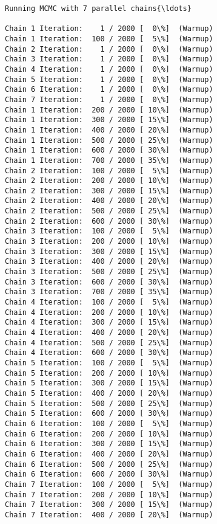 \documentclass[11pt]{article}
\begin{document}
    \begin{Verbatim}[commandchars=\\\{\}]
Running MCMC with 7 parallel chains{\ldots}

Chain 1 Iteration:    1 / 2000 [  0\%]  (Warmup)
Chain 1 Iteration:  100 / 2000 [  5\%]  (Warmup)
Chain 2 Iteration:    1 / 2000 [  0\%]  (Warmup)
Chain 3 Iteration:    1 / 2000 [  0\%]  (Warmup)
Chain 4 Iteration:    1 / 2000 [  0\%]  (Warmup)
Chain 5 Iteration:    1 / 2000 [  0\%]  (Warmup)
Chain 6 Iteration:    1 / 2000 [  0\%]  (Warmup)
Chain 7 Iteration:    1 / 2000 [  0\%]  (Warmup)
Chain 1 Iteration:  200 / 2000 [ 10\%]  (Warmup)
Chain 1 Iteration:  300 / 2000 [ 15\%]  (Warmup)
Chain 1 Iteration:  400 / 2000 [ 20\%]  (Warmup)
Chain 1 Iteration:  500 / 2000 [ 25\%]  (Warmup)
Chain 1 Iteration:  600 / 2000 [ 30\%]  (Warmup)
Chain 1 Iteration:  700 / 2000 [ 35\%]  (Warmup)
Chain 2 Iteration:  100 / 2000 [  5\%]  (Warmup)
Chain 2 Iteration:  200 / 2000 [ 10\%]  (Warmup)
Chain 2 Iteration:  300 / 2000 [ 15\%]  (Warmup)
Chain 2 Iteration:  400 / 2000 [ 20\%]  (Warmup)
Chain 2 Iteration:  500 / 2000 [ 25\%]  (Warmup)
Chain 2 Iteration:  600 / 2000 [ 30\%]  (Warmup)
Chain 3 Iteration:  100 / 2000 [  5\%]  (Warmup)
Chain 3 Iteration:  200 / 2000 [ 10\%]  (Warmup)
Chain 3 Iteration:  300 / 2000 [ 15\%]  (Warmup)
Chain 3 Iteration:  400 / 2000 [ 20\%]  (Warmup)
Chain 3 Iteration:  500 / 2000 [ 25\%]  (Warmup)
Chain 3 Iteration:  600 / 2000 [ 30\%]  (Warmup)
Chain 3 Iteration:  700 / 2000 [ 35\%]  (Warmup)
Chain 4 Iteration:  100 / 2000 [  5\%]  (Warmup)
Chain 4 Iteration:  200 / 2000 [ 10\%]  (Warmup)
Chain 4 Iteration:  300 / 2000 [ 15\%]  (Warmup)
Chain 4 Iteration:  400 / 2000 [ 20\%]  (Warmup)
Chain 4 Iteration:  500 / 2000 [ 25\%]  (Warmup)
Chain 4 Iteration:  600 / 2000 [ 30\%]  (Warmup)
Chain 5 Iteration:  100 / 2000 [  5\%]  (Warmup)
Chain 5 Iteration:  200 / 2000 [ 10\%]  (Warmup)
Chain 5 Iteration:  300 / 2000 [ 15\%]  (Warmup)
Chain 5 Iteration:  400 / 2000 [ 20\%]  (Warmup)
Chain 5 Iteration:  500 / 2000 [ 25\%]  (Warmup)
Chain 5 Iteration:  600 / 2000 [ 30\%]  (Warmup)
Chain 6 Iteration:  100 / 2000 [  5\%]  (Warmup)
Chain 6 Iteration:  200 / 2000 [ 10\%]  (Warmup)
Chain 6 Iteration:  300 / 2000 [ 15\%]  (Warmup)
Chain 6 Iteration:  400 / 2000 [ 20\%]  (Warmup)
Chain 6 Iteration:  500 / 2000 [ 25\%]  (Warmup)
Chain 6 Iteration:  600 / 2000 [ 30\%]  (Warmup)
Chain 7 Iteration:  100 / 2000 [  5\%]  (Warmup)
Chain 7 Iteration:  200 / 2000 [ 10\%]  (Warmup)
Chain 7 Iteration:  300 / 2000 [ 15\%]  (Warmup)
Chain 7 Iteration:  400 / 2000 [ 20\%]  (Warmup)

\end{Verbatim}
\end{document}
